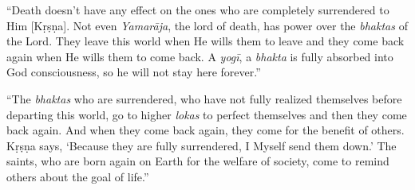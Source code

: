 \enquote{Death doesn’t have any effect on the ones who are completely surrendered to Him [Kṛṣṇa]. Not even \textit{Yamarāja}, the lord of death, has power over the \textit{bhaktas} of the Lord. They leave this world when He wills them to leave and they come back again when He wills them to come back. A \textit{yogī}, a \textit{bhakta} is fully absorbed into God consciousness, so he will not stay here forever.}

\enquote{The \textit{bhaktas} who are surrendered, who have not fully realized themselves before departing this world, go to higher \textit{lokas} to perfect themselves and then they come back again. And when they come back again, they come for the benefit of others. Kṛṣṇa says, \enquote{Because they are fully surrendered, I Myself send them down.} The saints, who are born again on Earth for the welfare of society, come to remind others about the goal of life.}
